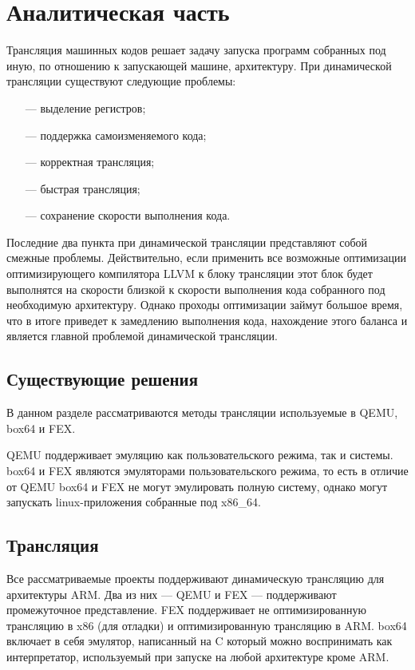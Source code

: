 \section{Аналитическая часть}
 
Трансляция машинных кодов решает задачу запуска программ собранных под иную, по отношению к запускающей машине, архитектуру. При динамической трансляции существуют следующие проблемы:

\begin{itemize}[leftmargin=1.6\parindent]
	\item[---] выделение регистров;
	\item[---] поддержка самоизменяемого кода;
	\item[---] корректная трансляция;
	\item[---] быстрая трансляция;
	\item[---] сохранение скорости выполнения кода.
\end{itemize}

Последние два пункта при динамической трансляции представляют собой смежные проблемы. Действительно, если применить все возможные оптимизации оптимизирующего компилятора LLVM к блоку трансляции этот блок будет выполнятся на скорости близкой к скорости выполнения кода собранного под необходимую архитектуру. Однако проходы оптимизации займут большое время, что в итоге приведет к замедлению выполнения кода, нахождение этого баланса и является главной проблемой динамической трансляции. 

\subsection{Существующие решения}

В данном разделе рассматриваются методы трансляции используемые в QEMU, box64 и FEX.

QEMU поддерживает эмуляцию как пользовательского режима, так и системы. box64 и FEX являются эмуляторами пользовательского режима, то есть в отличие от QEMU box64 и FEX не могут эмулировать полную систему, однако могут запускать linux-приложения собранные под x86\_64.

\subsection{Трансляция}

Все рассматриваемые проекты поддерживают динамическую трансляцию для архитектуры ARM. Два из них --- QEMU и FEX --- поддерживают промежуточное представление. FEX поддерживает не оптимизированную трансляцию в x86 (для отладки) и оптимизированную трансляцию в ARM. box64 включает в себя эмулятор, написанный на C который можно воспринимать как интерпретатор, используемый при запуске на любой архитектуре кроме ARM.

